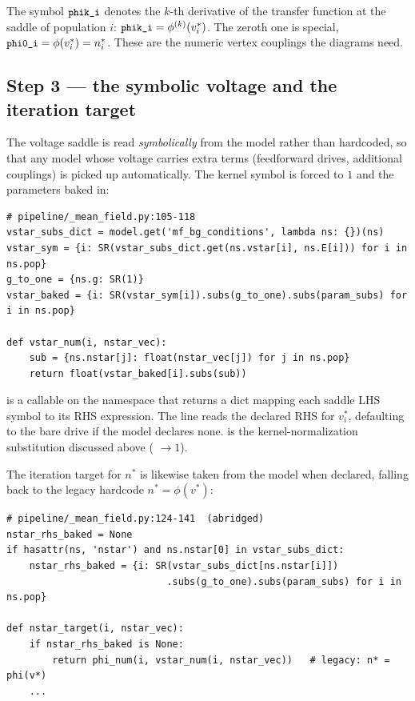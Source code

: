 \begin{defn}
The symbol $\texttt{\small phik\_i}$ denotes the $k$-th derivative of the transfer
function at the saddle of population $i$: $\texttt{\small phik\_i} = \phi^{(k)}(v^{*}_i)$.
The zeroth one is special, $\texttt{\small phi0\_i} = \phi(v^{*}_i) = n^{*}_i$. These are
the numeric vertex couplings the diagrams need.
\end{defn}

\subsection{Step 3 --- the symbolic voltage and the iteration target}

The voltage saddle is read \emph{symbolically} from the model rather than
hardcoded, so that any model whose voltage carries extra terms (feedforward
drives, additional couplings) is picked up automatically. The kernel symbol is
forced to $1$ and the parameters baked in:

\begin{lstlisting}
# pipeline/_mean_field.py:105-118
vstar_subs_dict = model.get('mf_bg_conditions', lambda ns: {})(ns)
vstar_sym = {i: SR(vstar_subs_dict.get(ns.vstar[i], ns.E[i])) for i in ns.pop}
g_to_one = {ns.g: SR(1)}
vstar_baked = {i: SR(vstar_sym[i]).subs(g_to_one).subs(param_subs) for i in ns.pop}

def vstar_num(i, nstar_vec):
    sub = {ns.nstar[j]: float(nstar_vec[j]) for j in ns.pop}
    return float(vstar_baked[i].subs(sub))
\end{lstlisting}

 is a callable on the namespace that returns a dict
mapping each saddle LHS symbol to its RHS expression. The line
 reads the declared RHS for
$v^{*}_i$, defaulting to the bare drive  if the model declares
none.  is the kernel-normalization substitution discussed above
( $\to 1$).

The iteration target for $n^{*}$ is likewise taken from the model when declared,
falling back to the legacy hardcode $n^{*} = \phi(v^{*})$:

\begin{lstlisting}
# pipeline/_mean_field.py:124-141  (abridged)
nstar_rhs_baked = None
if hasattr(ns, 'nstar') and ns.nstar[0] in vstar_subs_dict:
    nstar_rhs_baked = {i: SR(vstar_subs_dict[ns.nstar[i]])
                            .subs(g_to_one).subs(param_subs) for i in ns.pop}

def nstar_target(i, nstar_vec):
    if nstar_rhs_baked is None:
        return phi_num(i, vstar_num(i, nstar_vec))   # legacy: n* = phi(v*)
    ...
\end{lstlisting}

